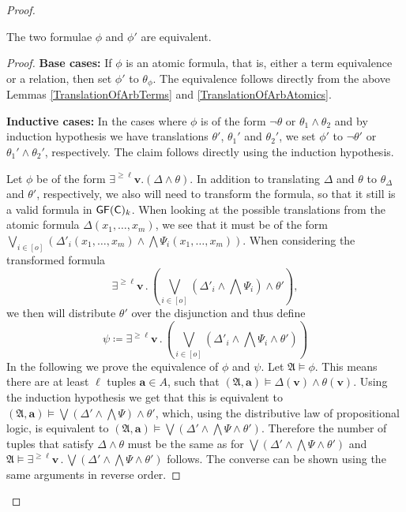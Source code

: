 \begin{proof}
	\begin{claim}
		The two formulae $\phi$ and $\phi'$ are equivalent.
	\end{claim}
	\begin{proof}
		\textbf{Base cases:}
		If $\phi$ is an atomic formula, that is, either a term equivalence or a relation, then set $\phi'$ to $\theta_\phi$.
		The equivalence follows directly from the above Lemmas \ref{TranslationOfArbTerms} and \ref{TranslationOfArbAtomics}.
		
		\textbf{Inductive cases:}
		In the cases where $\phi$ is of the form $\neg\theta$ or $\theta_1\land\theta_2$ and by induction hypothesis we have translations $\theta'$, $\theta_1'$ and $\theta_2'$, we set $\phi'$ to $\neg\theta'$ or $\theta_1'\land\theta_2'$, respectively.
		The claim follows directly using the induction hypothesis.
		
		Let $\phi$ be of the form $\exists^{\geq\ell}\mathbf v. (\Delta\land \theta)$.
		In addition to translating $\Delta$ and $\theta$ to $\theta_\Delta$ and $\theta'$, respectively, we also will need to transform the formula, so that it still is a valid formula in $\mathsf{GF}(\mathsf{C})_k$.
		When looking at the possible translations from the atomic formula $\Delta(x_1,\dots,x_m)$, we see that it must be of the form $\bigvee_{i\in[o]} (\Delta'_i(x_1,\dots,x_m) \land \bigwedge \Psi_i(x_1,\dots,x_m))$.
		When considering the transformed formula 
		$$\exists^{\geq \ell}\mathbf v\operatorname{.} \left(\bigvee_{i\in [o]}\left(\Delta'_i\land\bigwedge \Psi_i\right) \land \theta'\right),$$
		we then will distribute $\theta'$ over the disjunction and thus define
		$$\psi \coloneqq \exists^{\geq \ell}\mathbf v\operatorname{.} \left(\bigvee_{i\in[o]} \left(\Delta'_i\land\bigwedge \Psi_i \land \theta'\right)\right)$$
		In the following we prove the equivalence of $\phi$ and $\psi$.
		Let $\mathfrak A\models \phi$.
		This means there are at least $\ell$ tuples $\mathbf a\in A$, such that $(\mathfrak A,\mathbf a)\models \Delta(\mathbf v) \land \theta(\mathbf v)$.
		Using the induction hypothesis we get that this is equivalent to $(\mathfrak A,\mathbf a)\models \bigvee(\Delta'\land\bigwedge\Psi)\land \theta'$, which, using the distributive law of propositional logic, is equivalent to $(\mathfrak A,\mathbf a)\models \bigvee(\Delta'\land\bigwedge\Psi\land\theta')$.
		Therefore the number of tuples that satisfy $\Delta\land\theta$ must be the same as for $\bigvee(\Delta'\land\bigwedge\Psi\land\theta')$ and $\mathfrak A\models \exists^{\geq\ell}\mathbf v\operatorname{.} \bigvee (\Delta'\land\bigwedge\Psi\land\theta')$ follows.
		The converse can be shown using the same arguments in reverse order.
		

\end{proof}
\end{proof}
